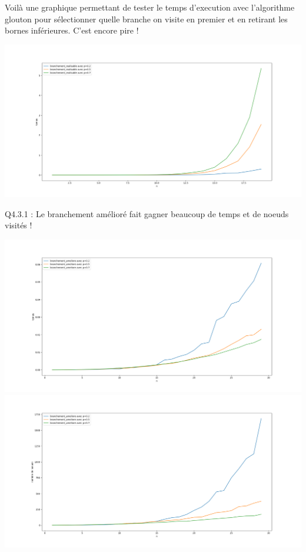 \documentclass[a4paper]{article}
\begin{document}
Voilà une graphique permettant de tester le temps d'execution avec l'algorithme glouton pour sélectionner quelle branche on visite en premier et en retirant les bornes inférieures. C'est encore pire !

\includegraphics[scale=0.3]{"./test_branchement_realisable.png"}

Q4.3.1 : 
Le branchement amélioré fait gagner beaucoup de temps et de noeuds visités !

\includegraphics[scale=0.3]{"./test_branchement_ameliore.png"}
\includegraphics[scale=0.3]{"./test_nombre_noeuds_branchement_ameliore.png"}
\end{document}
